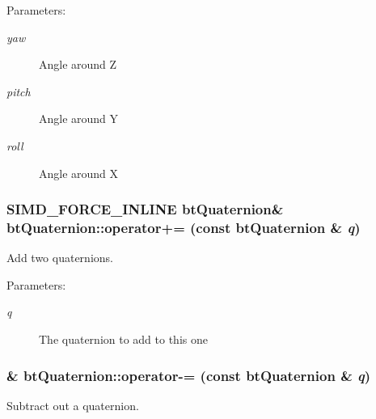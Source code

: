 \begin{Desc}
\item[Parameters:]
\begin{description}
\item[{\em yaw}]Angle around Z \item[{\em pitch}]Angle around Y \item[{\em roll}]Angle around X \end{description}
\end{Desc}
\hypertarget{classbt_quaternion_1212e4cbaa71da187984d3c174a4cc04}{
\subsubsection[operator+=]{\setlength{\rightskip}{0pt plus 5cm}SIMD\_\-FORCE\_\-INLINE {\bf btQuaternion}\& btQuaternion::operator+= (const {\bf btQuaternion} \& {\em q})}}
\label{classbt_quaternion_1212e4cbaa71da187984d3c174a4cc04}


Add two quaternions. 

\begin{Desc}
\item[Parameters:]
\begin{description}
\item[{\em q}]The quaternion to add to this one \end{description}
\end{Desc}
\hypertarget{classbt_quaternion_c942e70c62d09538e3f6d9c42bc42c5c}{
\subsubsection[operator-=]{\& btQuaternion::operator-= (const {\bf btQuaternion} \& {\em q})}}
\label{classbt_quaternion_c942e70c62d09538e3f6d9c42bc42c5c}


Subtract out a quaternion. 

